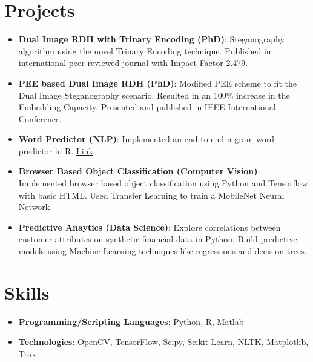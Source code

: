 \documentclass[a4paper,11pt]{article}
\newcommand{\resumeItem}[2]{
  \item\small{
    \textbf{#1}{: #2 \vspace{-2pt}}
  }
}
\newcommand{\resumeSubItem}[2]{\resumeItem{#1}{#2}\vspace{-4pt}}
\newcommand{\resumeSubHeadingListStart}{\begin{itemize}[leftmargin=*]}
\newcommand{\resumeSubHeadingListEnd}{\end{itemize}}
\begin{document}
\section{Projects}
  \resumeSubHeadingListStart
    \resumeSubItem{Dual Image RDH with Trinary Encoding (PhD)}
      {Steganography algorithm using the novel Trinary Encoding technique. Published in international  peer-reviewed journal with Impact Factor 2.479.}
    \resumeSubItem{PEE based Dual Image RDH (PhD)}
      {Modified PEE scheme to fit the Dual Image Steganography scenario. Resulted in an 100\% increase in the Embedding Capacity. Presented and published in IEEE International Conference.}
    \resumeSubItem{Word Predictor (NLP)}
      {Implemented an end-to-end n-gram word predictor in R.} \href{https://shounakshastri.github.io/blogposts/}{Link}
    \resumeSubItem{Browser Based Object Classification (Computer Vision)}
      {Implemented browser based object classification using Python and Tensorflow with basic HTML. Used Transfer Learning to train a MobileNet Neural Network.}
     \resumeSubItem{Predictive Anaytics (Data Science)}{Explore correlations between customer attributes on synthetic financial data in Python. Build predictive models using Machine Learning techniques like regressions and decision trees.}
  \resumeSubHeadingListEnd

%
\section{Skills}
	\begin{itemize}[leftmargin=*, itemsep = -4pt]
		\item{\textbf{Programming/Scripting Languages}{: Python, R, Matlab}}
		\item{\textbf{Technologies}{: OpenCV, TensorFlow, Scipy, Scikit Learn, NLTK, Matplotlib, Trax}}
	\end{itemize}


\end{document}
